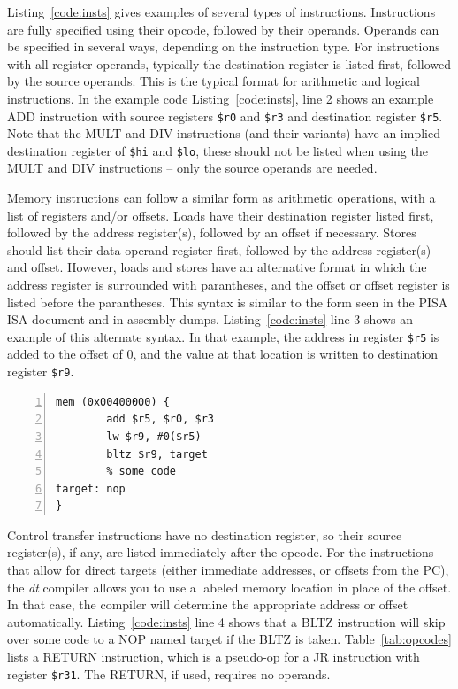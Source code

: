 Listing~\ref{code:insts} gives examples 
of several types of instructions.  Instructions are 
fully specified using their opcode, followed by 
their operands.  Operands can be specified in several ways, depending
on the instruction type.  For instructions with all register operands,
typically the destination register is listed first, followed by the 
source operands.  This is the typical format for arithmetic and logical 
instructions.  In the example code Listing~\ref{code:insts}, line 
2 shows an example ADD instruction with source registers \texttt{\$r0} and 
\texttt{\$r3} and destination register \texttt{\$r5}.  Note that the MULT
and DIV instructions (and their variants) have an implied destination register 
of \texttt{\$hi} and \texttt{\$lo}, these should not be listed 
when using the MULT and DIV instructions -- only the source 
operands are needed.

Memory instructions can follow a similar form as arithmetic operations,
with a list of registers and/or offsets.  Loads have their destination 
register listed first, followed by the address register(s), followed 
by an offset if necessary.  Stores should list their data operand register
first, followed by the address register(s) and offset.  However, loads and 
stores have an alternative format in which the address register is surrounded 
with parantheses, and the offset or offset register is listed before the
parantheses. This syntax is similar to the form seen in the PISA ISA document
and in assembly dumps.  Listing~\ref{code:insts} line 3 shows an example of this 
alternate syntax.  In that example, the address in register \texttt{\$r5} is 
added to the offset of 0, and the value at that location is written to
destination register \texttt{\$r9}.

\begin{lstlisting}[label=code:insts,caption=Code example of several instructions,basicstyle=\footnotesize,numbers=left,numberstyle=\tiny,stepnumber=1, numbersep=6pt,frame=single,captionpos=b,escapechar=@]
mem (0x00400000) {
        add $r5, $r0, $r3
        lw $r9, #0($r5)
        bltz $r9, target
        % some code
target: nop
}
\end{lstlisting}

Control transfer instructions have no destination register, so their 
source register(s), if any, are listed immediately after the opcode.
For the instructions that allow for direct targets (either immediate 
addresses, or offsets from the PC), the \emph{dt} compiler allows 
you to use a labeled memory location in place of the offset.  In that
case, the compiler will determine the appropriate address or offset
automatically.  Listing~\ref{code:insts} line 4 shows that a BLTZ
instruction will skip over some code to a NOP named target if the BLTZ 
is taken.  Table~\ref{tab:opcodes} lists a RETURN instruction, which 
is a pseudo-op for a JR instruction with register \texttt{\$r31}. The
RETURN, if used, requires no operands.

